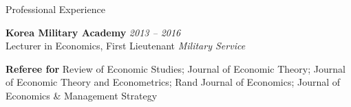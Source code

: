 
\begin{rSection}{Professional Experience}

{\bf Korea Military Academy} \hfill {\em 2013 -- 2016} \\[5pt] 
Lecturer in Economics, First Lieutenant \hfill {\em Military Service}

\medskip 

{\bf Referee for } Review of Economic Studies; Journal of Economic Theory; Journal of Economic Theory and Econometrics; Rand Journal of Economics; Journal of Economics \& Management Strategy

\end{rSection}